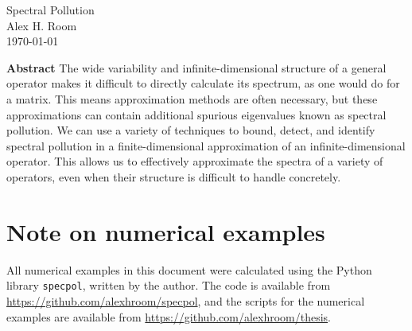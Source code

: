 \documentclass{article}
\newcommand{\1}{\mathbf{1}} %
\begin{document}
  \begin{titlepage}
    \vspace*{\fill}
    \begin{center}
      {\Huge Spectral Pollution}\\[0.5cm]
      {\Large Alex H. Room}\\[0.4cm]
      {\Large \today}
    \end{center}
     \vspace{\fill}
     {\normalsize\textbf{Abstract} 
     The wide variability and infinite-dimensional structure of a general operator makes it
     difficult to directly calculate its spectrum, as one would do for a matrix. This means
     approximation methods are often necessary, but these approximations can contain additional
     spurious eigenvalues known as spectral pollution. We can use a variety of techniques to
     bound, detect, and identify spectral pollution in a finite-dimensional approximation of
     an infinite-dimensional operator. This allows us to effectively approximate the spectra of
     a variety of operators, even when their structure is difficult to handle concretely.}
     \vspace*{\fill}
  \end{titlepage}
\tableofcontents
\clearpage


\clearpage


\clearpage


\clearpage


\clearpage


\clearpage

\appendix
{}
\section{Note on numerical examples}\label{sec:numerical-note}
All numerical examples in this document were calculated using the Python library \texttt{specpol}, written
by the author. The code is available from \url{https://github.com/alexhroom/specpol}, and the scripts for the
numerical examples are available from \url{https://github.com/alexhroom/thesis}.
\end{document}
